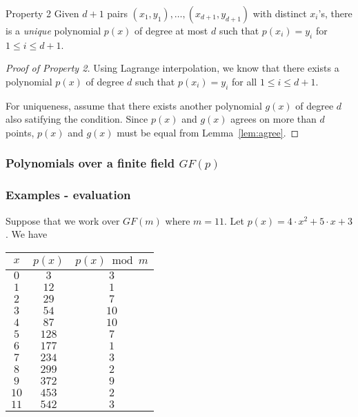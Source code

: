 \begin{frame}
  \begin{block}{Property 2}
    Given $d+1$ pairs
    $(x_1,y_1),\ldots,(x_{d+1},y_{d+1})$ with distinct $x_i$'s, there
    is a {\em unique} polynomial $p(x)$ of degree at most $d$ such
    that $p(x_i)=y_i$ for $1\leq i\leq d+1$.
  \end{block}

  \begin{proof}[Proof of Property 2]
    Using Lagrange interpolation, we know that there exists a
    polynomial $p(x)$ of degree $d$ such that $p(x_i)=y_i$ for all
    $1\leq i\leq d+1$.

    For uniqueness, assume that there exists another polynomial $g(x)$
    of degree $d$ also satifying the condition.  Since $p(x)$ and
    $g(x)$ agrees on more than $d$ points, $p(x)$ and $g(x)$ must be
    equal from Lemma~\ref{lem:agree}.
  \end{proof}
\end{frame}

\begin{frame}
  \frametitle{Polynomials over a finite field $GF(p)$}
\end{frame}

\begin{frame}
  \frametitle{Examples - evaluation}

  Suppose that we work over $GF(m)$ where $m=11$.  Let $p(x) = 4\cdot
  x^2 + 5\cdot x + 3$.  We have

  {\small
  \begin{tabular}{c|c|c}
    $x$ & $p(x)$ & $p(x)\bmod m$ \\
    \hline
    $0$ & $3$ & $3$ \\
    $1$ & $12$ & $1$ \\
    $2$ & $29$ & $7$ \\
    $3$ & $54$ & $10$ \\
    $4$ & $87$ & $10$ \\
    $5$ & $128$ & $7$ \\
    $6$ & $177$ & $1$ \\
    $7$ & $234$ & $3$ \\
    $8$ & $299$ & $2$ \\
    $9$ & $372$ & $9$ \\
    $10$ & $453$ & $2$ \\
    $11$ & $542$ & $3$ \\
  \end{tabular}
  }
\end{frame}

